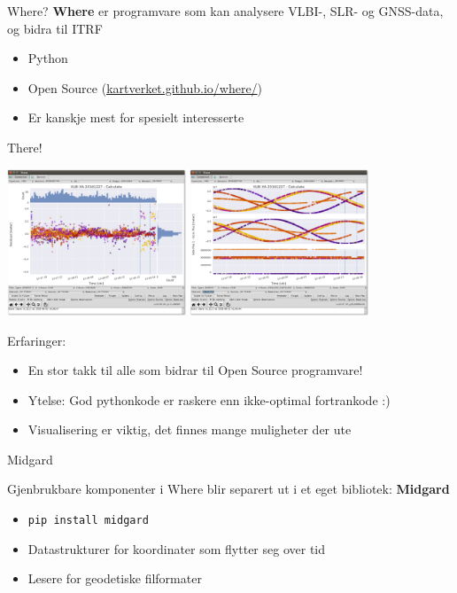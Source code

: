 \documentclass[12pt,table,t]{beamer}
\begin{document}
\begin{frame}[c]{Where?}
  \textbf{Where} er programvare som kan analysere VLBI-, SLR- og GNSS-data, og bidra til ITRF

  \begin{itemize}
  \item<2-> Python
  \item<3-> Open Source (\url{kartverket.github.io/where/})
  \item<4-> Er kanskje mest for spesielt interesserte
  \end{itemize}
\end{frame}


\begin{frame}[c]{There!}
  \begin{center}
    \includegraphics[width=0.4\textwidth]{figure/there_01} \hfil
    \includegraphics[width=0.4\textwidth]{figure/there_02}
  \end{center}

  Erfaringer:
  \begin{itemize}
  \item<2-> En stor takk til alle som bidrar til Open Source programvare!
  \item<3-> Ytelse: God pythonkode er raskere enn ikke-optimal fortrankode :)
  \item<4-> Visualisering er viktig, det finnes mange muligheter der ute
  \end{itemize}
\end{frame}


\begin{frame}[c]{Midgard}

  Gjenbrukbare komponenter i Where blir separert ut i et eget bibliotek: \textbf{Midgard}

  \begin{itemize}
  \item \texttt{pip install midgard}
  \item Datastrukturer for koordinater som flytter seg over tid
  \item Lesere for geodetiske filformater
  \end{itemize}
\end{frame}
\end{document}
